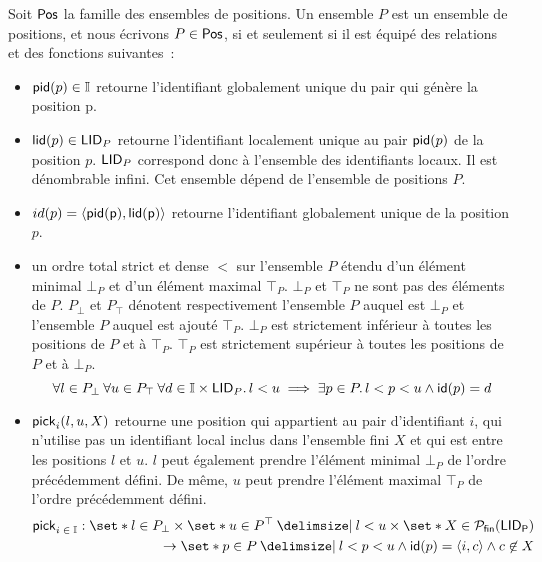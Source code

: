 \clearpage

\begin{definition}[Positions]\label{def:pos}
Soit $\trm{Pos}$ la famille des ensembles de positions.
Un ensemble $P$ est un ensemble de positions, et nous écrivons $P \in \trm{Pos}$, si et seulement si il est équipé des relations et des fonctions suivantes~:
\begin{itemize}
\item $\trm{pid}(p) \in \mathbb{I}$ retourne l'identifiant globalement unique du pair qui génère la position p.

\item $\trm{lid}(p) \in \trm{LID}_P$ retourne l'identifiant localement unique au pair $\trm{pid}(p)$ de la position $p$.
$\trm{LID}_P$ correspond donc à l'ensemble des identifiants locaux.
Il est dénombrable infini.
Cet ensemble dépend de l'ensemble de positions $P$.

\item $id(p) = \tuple*{\trm{\trm{pid}(p), \trm{lid}(p)}}$ retourne l'identifiant globalement unique de la position $p$.

\item un ordre total strict et dense $<$ sur l'ensemble $P$ étendu d'un élément minimal $\bot_P$ et d'un élément maximal $\top_P$.
$\bot_P$ et $\top_P$ ne sont pas des éléments de $P$.
$P_{\bot}$ et $P_{\top}$ dénotent respectivement l'ensemble $P$ auquel est $\bot_P$ et l'ensemble $P$ auquel est ajouté $\top_P$.
$\bot_P$ est strictement inférieur à toutes les positions de $P$ et à $\top_P$.
$\top_P$ est strictement supérieur à toutes les positions de $P$ et à $\bot_P$.
\begin{equation*}
\forall l \in P_{\bot} \:\forall u \in P_{\top} \:\forall d \in \mathbb{I} \times \trm{LID}_P \qsep l < u \implies \exists p \in P \qsep l < p < u \land \trm{id}(p) = d
\end{equation*}

\item $\trm{pick}_i(l, u, X)$ retourne une position qui appartient au pair d'identifiant $i$, qui n'utilise pas un identifiant local inclus dans l'ensemble fini $X$ et qui est entre les positions $l$ et $u$.
$l$ peut également prendre l'élément minimal $\bot_P$ de l'ordre précédemment défini.
De même, $u$ peut prendre l'élément maximal $\top_P$ de l'ordre précédemment défini.
\begin{equation*}\begin{split}
    \trm{pick}_{i\;\in\;\mathbb{I}}: \set*{l \in P_{\bot}} \times \set*{u \in P^{\top} \given l < u} \times \set*{X \in \powerfset{\trm{LID_P}}}\\
    \to \set*{p \in P \given l < p < u \land \trm{id}(p) = \tuple*{i, c} \land c \not\in X}
\end{split}\end{equation*}
\end{itemize}
\end{definition}

